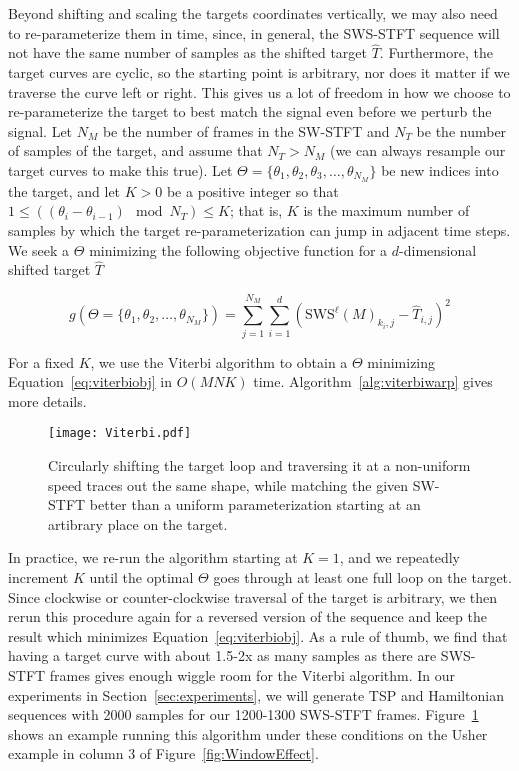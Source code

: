 \documentclass[runningheads]{llncs}
\begin{document}
Beyond shifting and scaling the targets coordinates vertically, we may also need to re-parameterize them in time, since, in general, the SWS-STFT sequence will not have the same number of samples as the shifted target $\hat{T}$.  Furthermore, the target curves are cyclic, so the starting point is arbitrary, nor does it matter if we traverse the curve left or right.  This gives us a lot of freedom in how we choose to re-parameterize the target to best match the signal even before we perturb the signal.  Let $N_M$ be the number of frames in the SW-STFT and $N_T$ be the number of samples of the target, and assume that $N_T > N_M$ (we can always resample our target curves to make this true).  Let $\Theta = \{ \theta_1, \theta_2, \theta_3, \hdots, \theta_{N_M} \}$ be new indices into the target, and let $K > 0$ be a positive integer so that $1 \leq \left( (\theta_i - \theta_{i-1}) \mod N_T \right) \leq K$; that is, $K$ is the maximum number of samples by which the target re-parameterization can jump in adjacent time steps.  We seek a $\Theta$ minimizing the following objective function for a $d$-dimensional shifted target $\hat{T}$

\begin{equation}
  \label{eq:viterbiobj}
  g(\Theta = \{\theta_1, \theta_2, \hdots, \theta_{N_M}\}) = \sum_{j = 1}^{N_M} \sum_{i=1}^d \left( \text{SWS}^{\ell} (M)_{k_i, j} - \hat{T}_{i, j}  \right)^2
\end{equation}

For a fixed $K$, we use the Viterbi algorithm to obtain a $\Theta$ minimizing Equation~\ref{eq:viterbiobj} in $O(MNK)$ time.  Algorithm~\ref{alg:viterbiwarp} gives more details.  

\begin{figure}
  \centering
  \texttt{[image: Viterbi.pdf]}
  \caption{Circularly shifting the target loop and traversing it at a non-uniform speed traces out the same shape, while matching the given SW-STFT better than a uniform parameterization starting at an artibrary place on the target.}
  \label{fig:ViterbiWarp}
\end{figure}

In practice, we re-run the algorithm starting at $K = 1$, and we repeatedly increment $K$ until the optimal $\Theta$ goes through at least one full loop on the target.  Since clockwise or counter-clockwise traversal of the target is arbitrary, we then rerun this procedure again for a reversed version of the sequence and keep the result which minimizes Equation~\ref{eq:viterbiobj}.  As a rule of thumb, we find that having a target curve with about 1.5-2x as many samples as there are SWS-STFT frames gives enough wiggle room for the Viterbi algorithm.  In our experiments in Section~\ref{sec:experiments}, we will generate TSP and Hamiltonian sequences with 2000 samples for our 1200-1300 SWS-STFT frames.  Figure~\ref{fig:ViterbiWarp} shows an example running this algorithm under these conditions on the Usher example in column 3 of Figure~\ref{fig:WindowEffect}.
\end{document}
